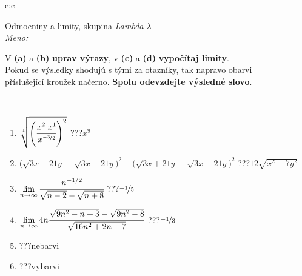 \documentclass[10pt]{report}
\begin{document}
\newpage
\thispagestyle{empty}
\begin{tabular}{c:c}
\begin{minipage}[c][104.5mm][t]{0.5\linewidth}
\begin{center}
\vspace{7mm}
{\huge Odmocniny a limity, skupina \textit{Lambda $\lambda$} -}\\[5mm]
\textit{Meno:}\phantom{xxxxxxxxxxxxxxxxxxxxxxxxxxxxxxxxxxxxxxxxxxxxxxxxxxxxxxxxxxxxxxxxx}\\[5mm]
\begin{minipage}{0.95\linewidth}
\begin{center}
V \textbf{(a)} a \textbf{(b)} \textbf{uprav výrazy}, v \textbf{(c)} a \textbf{(d)} \textbf{vypočítaj limity}.\\Pokud se výsledky shodujú s tými za otazníky, tak napravo obarvi\\příslušející kroužek načerno. \textbf{Spolu odevzdejte výsledné slovo}.
\end{center}
\end{minipage}
\\[1mm]
\begin{minipage}{0.79\linewidth}
\begin{center}
\begin{varwidth}{\linewidth}
\begin{enumerate}
\small
\item $\sqrt[1]{\left(\cfrac{x^{2}\;x^{1}}{x^{\nicefrac{-3}{2}}}\right)^{2}}$\quad \dotfill\; ???\;\dotfill \quad $x^{9}$
\item {\footnotesize{\scriptsize$\big(\sqrt{3x+21y}+\sqrt{3x-21y}\big)^2-\big(\sqrt{3x+21y}-\sqrt{3x-21y}\big)^2$}\quad \dotfill\; ???\;\dotfill \quad $12\sqrt{x^2-7y^2}$}
\item $\lim\limits_{n\to\infty}\cfrac{n^{-1/2}}{\sqrt{n-2}-\sqrt{n+8}}$\quad \dotfill\; ???\;\dotfill \quad $\nicefrac{-1}{5}$
\item $\lim\limits_{n\to\infty}4n\cfrac{\sqrt{9n^2-n+3}-\sqrt{9n^2-8}}{\sqrt{16n^2+2n-7}}$\quad \dotfill\; ???\;\dotfill \quad $\nicefrac{-1}{3}$
\item \quad \dotfill\; ???\;\dotfill \quad nebarvi
\item \quad \dotfill\; ???\;\dotfill \quad vybarvi
\end{enumerate}
\end{varwidth}
\end{center}
\end{minipage}
\begin{minipage}{0.20\linewidth}

\end{minipage}
\end{center}
\end{minipage}
\end{tabular}
\end{document}
